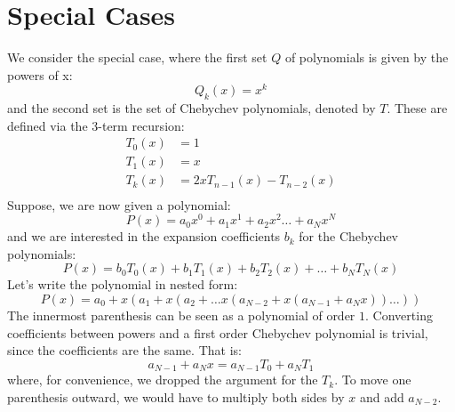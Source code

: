 \section{Special Cases}
We consider the special case, where the first set $Q$ of polynomials is given by the powers of x: 
\begin{equation}
 Q_k(x) = x^k
\end{equation}
and the second set is the set of Chebychev polynomials, denoted by $T$. These are defined via the 3-term recursion: 
\begin{equation}
 \begin{aligned}
  T_0(x) &= 1                          \\
  T_1(x) &= x                          \\
  T_k(x) &= 2x T_{n-1}(x) - T_{n-2}(x) \\
 \end{aligned}
\end{equation}
Suppose, we are now given a polynomial:
\begin{equation}
 P(x) = a_0 x^0 + a_1 x^1 + a_2 x^2 \ldots + a_N x^N
\end{equation}
and we are interested in the expansion coefficients $b_k$ for the Chebychev polynomials:
\begin{equation}
 P(x) = b_0 T_0(x) + b_1 T_1(x) + b_2 T_2(x) + \ldots + b_N T_N(x)
\end{equation}
Let's write the polynomial in nested form:
\begin{equation}
 P(x) = a_0 + x (a_1 + x (a_2 + \ldots x(a_{N-2} + x(a_{N-1} + a_N x)) \ldots ))
\end{equation}
The innermost parenthesis can be seen as a polynomial of order $1$. Converting coefficients between powers and a first order Chebychev polynomial is trivial, since the coefficients are the same. That is:
\begin{equation}
 a_{N-1} + a_N x = a_{N-1} T_0 + a_N T_1
\end{equation}
where, for convenience, we dropped the argument for the $T_k$. To move one parenthesis outward, we would have to multiply both sides by $x$ and add $a_{N-2}$.








